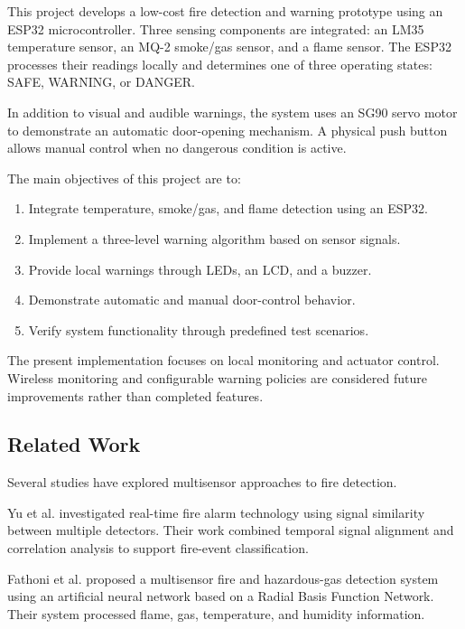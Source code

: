 \documentclass[12pt,a4paper]{article}
\begin{document}
This project develops a low-cost fire detection and
warning prototype using an ESP32 microcontroller.
Three sensing components are integrated: an LM35
temperature sensor, an MQ-2 smoke/gas sensor, and a
flame sensor. The ESP32 processes their readings
locally and determines one of three operating states:
SAFE, WARNING, or DANGER.

In addition to visual and audible warnings, the
system uses an SG90 servo motor to demonstrate an
automatic door-opening mechanism. A physical push
button allows manual control when no dangerous
condition is active.

The main objectives of this project are to:

\begin{enumerate}
    \item Integrate temperature, smoke/gas, and
    flame detection using an ESP32.
    
    \item Implement a three-level warning algorithm
    based on sensor signals.
    
    \item Provide local warnings through LEDs,
    an LCD, and a buzzer.
    
    \item Demonstrate automatic and manual
    door-control behavior.
    
    \item Verify system functionality through
    predefined test scenarios.
\end{enumerate}

The present implementation focuses on local
monitoring and actuator control. Wireless monitoring
and configurable warning policies are considered
future improvements rather than completed features.

\subsection{Related Work}

Several studies have explored multisensor approaches
to fire detection.

Yu et al. \cite{yu2023multidetector} investigated
real-time fire alarm technology using signal similarity
between multiple detectors. Their work combined
temporal signal alignment and correlation analysis
to support fire-event classification.

Fathoni et al. \cite{fathoni2025multisensor} proposed
a multisensor fire and hazardous-gas detection system
using an artificial neural network based on a Radial
Basis Function Network. Their system processed flame,
gas, temperature, and humidity information.
\end{document}
